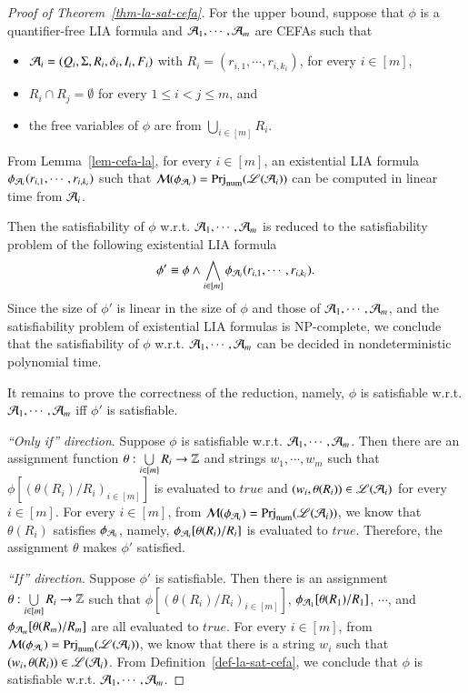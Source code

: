 {\begin{proof}[Proof of Theorem~\ref{thm-la-sat-cefa}]
	For the upper bound, suppose that $\phi$ is a quantifier-free LIA formula and $\mathcal{A}_1,\cdots,\mathcal{A}_m$ are CEFAs such that 
	\begin{itemize}
		\item	$\mathcal{A}_i=(Q_i, \Sigma, R_i, \delta_i, I_i, F_i)$  with $R_i = (r_{i, 1}, \cdots, r_{i, k_i})$, for every $i\in [m]$,
		\item $R_i \cap R_j = \emptyset$ for every $1 \le i < j \le m$, and
		\item the free variables of $\phi$ are from $\bigcup_{i\in [m]} R_i$.
	\end{itemize}
	From Lemma~\ref{lem-cefa-la}, for every $i \in [m]$, an existential LIA formula $\phi_{\mathcal{A}_i}(r_{i,1}, \cdots, r_{i, k_i})$ such that $\mathcal{M}(\phi_{\mathcal{A}_i})= {\rm Prj}_{\rm num}(\mathscr{L}(\mathcal{A}_i))$ can be computed in linear time from $\mathcal{A}_i$.
	
	Then the satisfiability of $\phi$ w.r.t. $\mathcal{A}_1,\cdots, \mathcal{A}_m$ is reduced to the satisfiability problem of the  following existential LIA formula
	\[
	\phi' \equiv \phi \wedge \bigwedge \limits_{i \in [m]} \phi_{\mathcal{A}_i}(r_{i,1}, \cdots, r_{i, k_i}).
	\]
	Since the size of $\phi'$ is linear in the size of $\phi$ and those of $\mathcal{A}_1,\cdots,\mathcal{A}_m$, and the satisfiability problem of existential LIA formulas is NP-complete, we conclude that the satisfiability of $\phi$ w.r.t.  $\mathcal{A}_1,\cdots,\mathcal{A}_m$ can be decided in nondeterministic polynomial time.
	
	It remains to prove the correctness of the reduction, namely, $\phi$ is satisfiable w.r.t. $\mathcal{A}_1,\cdots, \mathcal{A}_m$ iff $\phi'$ is satisfiable.
	
	\smallskip
	
	\noindent \emph{``Only if'' direction}. Suppose $\phi$ is satisfiable w.r.t. $\mathcal{A}_1,\cdots, \mathcal{A}_m$. Then there are an assignment function $\theta: \bigcup \limits_{i \in [m]} R_i \rightarrow \mathbb{Z}$ and strings $w_1, \cdots, w_m$  
	such that  $\phi[(\theta(R_i)/R_i)_{i \in [m]}]$ is evaluated to $true$ and $(w_i, \theta(R_i)) \in \mathscr{L}(\mathcal{A}_i)$ for every $i \in [m]$. For every $i \in [m]$, from $\mathcal{M}(\phi_{\mathcal{A}_i})={\rm Prj}_{\rm num}(\mathscr{L}(\mathcal{A}_i))$, we know that $\theta(R_i)$ satisfies $\phi_{\mathcal{A}_i}$, namely, $\phi_{\mathcal{A}_i}[\theta(R_i)/R_i]$ is evaluated to $true$. Therefore, the assignment $\theta$ makes $\phi'$ satisfied.
	
	\smallskip 
	
	\noindent \emph{``If'' direction}. Suppose $\phi'$ is satisfiable. Then there is an assignment $\theta: \bigcup \limits_{i \in [m]} R_i \rightarrow \mathbb{Z}$ such that $\phi[(\theta(R_i)/R_i)_{i \in [m]}]$, $\phi_{\mathcal{A}_1}[\theta(R_1)/R_1]$, $\cdots$, and $\phi_{\mathcal{A}_m}[\theta(R_m)/R_m]$ are all evaluated to $true$. For every $i \in [m]$, from $\mathcal{M}(\phi_{\mathcal{A}_i})={\rm Prj}_{\rm num}(\mathscr{L}(\mathcal{A}_i))$,  we know that there is a string $w_i$ such that $(w_i, \theta(R_i)) \in \mathscr{L}(\mathcal{A}_i)$. From Definition~\ref{def-la-sat-cefa}, we conclude that $\phi$ is satisfiable w.r.t. $\mathcal{A}_1,\cdots, \mathcal{A}_m$.
\end{proof}
}

